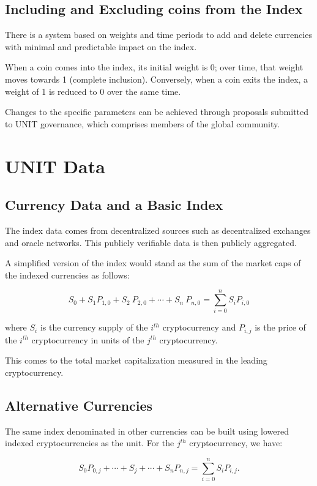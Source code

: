 \documentclass[12pt]{article}
\begin{document}
\subsection{Including and Excluding coins from the Index}

There is a system based on weights and time periods to add and delete currencies with minimal and predictable impact on the index.

When a coin comes into the index, its initial weight is 0; over time, that weight moves towards 1 (complete inclusion). Conversely, when a coin exits the index, a weight of 1 is reduced to 0 over the same time.

Changes to the specific parameters can be achieved through proposals submitted to UNIT governance, which comprises members of the global community.

\section{UNIT Data}

\subsection{Currency Data and a Basic Index}

The index data comes from decentralized sources such as decentralized exchanges and oracle networks. This publicly verifiable data is then publicly aggregated.

A simplified version of the index would stand as the sum of the market caps of the indexed currencies as follows: 

$$
S_0+S_1 P_{1,0}+ S_2\ P_{2,0}+\cdots+ S_n\ P_{n,0} = \sum_{i=0}^{n} S_iP_{i,0}
$$

where $S_i$ is the currency supply of the $i^{th}$ cryptocurrency and $P_{i,j}$ is the price of the $i^{th}$ cryptocurrency in units of the $j^{th}$ cryptocurrency.

This comes to the total market capitalization measured in the leading cryptocurrency.

\subsection{Alternative Currencies}

The same index denominated in other currencies can be built using lowered indexed cryptocurrencies as the unit. For the $j^{th}$ cryptocurrency, we have:

$$
S_0P_{0,j}+\cdots+S_j+\cdots+S_nP_{n,j} = \sum_{i=0}^{n} S_iP_{i,j}.
$$
\end{document}
